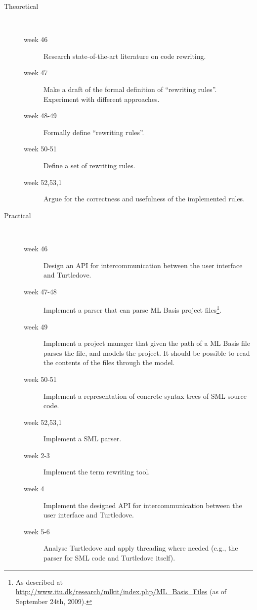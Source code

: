 \documentclass[a4paper,oneside]{article}
\begin{document}
\begin{description}
\item[Theoretical] \ \\
  \begin{description}
  \item[week 46] Research state-of-the-art literature on code rewriting.
    
  \item[week 47] Make a draft of the formal definition of ``rewriting rules''. Experiment with
    different approaches.
    
  \item[week 48-49] Formally define ``rewriting rules''.
    
  \item[week 50-51] Define a set of rewriting rules.
    
  \item[week 52,53,1] Argue for the correctness and usefulness of the implemented rules.
  \end{description}
  
\item[Practical] \ \\
  \begin{description}
    
  \item[week 46] Design an API for intercommunication between the user interface and Turtledove.
    
  \item[week 47-48] Implement a parser that can parse ML Basis project files\footnote{As described at
      \url{http://www.itu.dk/research/mlkit/index.php/ML_Basis_Files} (as of September 24th, 2009).}.
    
  \item[week 49] Implement a project manager that given the path of a ML Basis file parses the file,
    and models the project. It should be possible to read the contents of the files through the model.
    
  \item[week 50-51] Implement a representation of concrete syntax trees of SML source code.
    
  \item[week 52,53,1] Implement a SML parser.
    
  \item[week 2-3] Implement the term rewriting tool.
    
  \item[week 4] Implement the designed API for intercommunication between the user interface and
    Turtledove.
    
  \item[week 5-6] Analyse Turtledove and apply threading where needed (e.g., the parser for SML code
    and Turtledove itself).
  \end{description}
\end{description}
\end{document}
